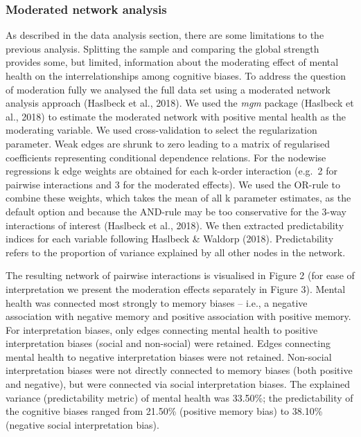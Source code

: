 \documentclass[man,floatsintext]{apa6}
\begin{document}
\hypertarget{moderated-network-analysis}{%
\subsubsection{Moderated network analysis}\label{moderated-network-analysis}}

As described in the data analysis section, there are some limitations to the previous analysis. Splitting the sample and comparing the global strength provides some, but limited, information about the moderating effect of mental health on the interrelationships among cognitive biases. To address the question of moderation fully we analysed the full data set using a moderated network analysis approach (Haslbeck et al., 2018). We used the \emph{mgm} package (Haslbeck et al., 2018) to estimate the moderated network with positive mental health as the moderating variable. We used cross-validation to select the regularization parameter. Weak edges are shrunk to zero leading to a matrix of regularised coefficients representing conditional dependence relations. For the nodewise regressions k edge weights are obtained for each k-order interaction (e.g.~2 for pairwise interactions and 3 for the moderated effects). We used the OR-rule to combine these weights, which takes the mean of all k parameter estimates, as the default option and because the AND-rule may be too conservative for the 3-way interactions of interest (Haslbeck et al., 2018). We then extracted predictability indices for each variable following Haslbeck \& Waldorp (2018). Predictability refers to the proportion of variance explained by all other nodes in the network.

The resulting network of pairwise interactions is visualised in Figure 2 (for ease of interpretation we present the moderation effects separately in Figure 3). Mental health was connected most strongly to memory biases -- i.e., a negative association with negative memory and positive association with positive memory. For interpretation biases, only edges connecting mental health to positive interpretation biases (social and non-social) were retained. Edges connecting mental health to negative interpretation biases were not retained. Non-social interpretation biases were not directly connected to memory biases (both positive and negative), but were connected via social interpretation biases. The explained variance (predictability metric) of mental health was 33.50\%; the predictability of the cognitive biases ranged from 21.50\% (positive memory bias) to 38.10\% (negative social interpretation bias).
\end{document}

